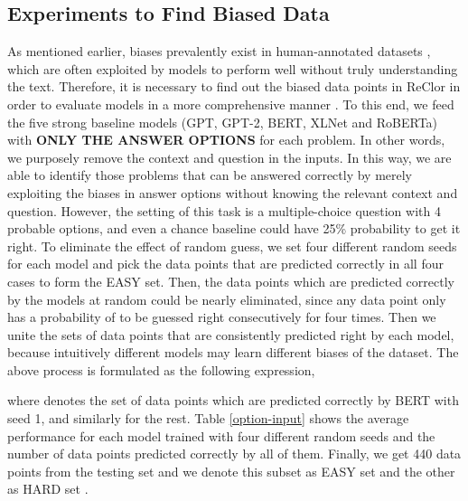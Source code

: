 \documentclass{article} \usepackage{iclr2020_conference,times}
\newcommand\bertbase{BERT\xspace}
\newcommand\xlnetbase{XLNet\xspace}
\newcommand\robertabase{RoBERTa\xspace}
\begin{document}
\subsection{Experiments to Find Biased Data}
As mentioned earlier, biases prevalently exist in human-annotated datasets \citep{poliak2018hypothesis, gururangan2018annotation, zellers2019hellaswag, niven2019probing}, which are often exploited by models to perform well without truly understanding the text. 
Therefore, it is necessary to find out the biased data points in ReClor in order to evaluate models in a more comprehensive manner \citep{sugawara2018makes}. To this end, we feed the five strong baseline models (GPT, GPT-2, \bertbase, \xlnetbase and \robertabase) with \textbf{ONLY THE ANSWER OPTIONS} for each problem. In other words, we purposely remove the context and question in the inputs. In this way, we are able to identify those problems that can be answered correctly by merely exploiting the biases in answer options without knowing the relevant context and question.  However, the setting of this task is a multiple-choice question with 4 probable options, and even a chance baseline could have 25\% probability to get it right. To eliminate the effect of random guess, we set four different random seeds for each model and pick the data points that are predicted correctly in all four cases to form the EASY set. Then, the data points which are predicted correctly by the models at random could be nearly eliminated, since any data point only has a probability of  to be guessed right consecutively for four times. Then we unite the sets of data points that are consistently predicted right by each model, because intuitively different models may learn different biases of the dataset. The above process is formulated as the following expression,


where  denotes the set of data points which are predicted correctly by \bertbase with seed 1, and similarly for the rest. Table \ref{option-input} shows the average performance for each model trained with four different random seeds and the number of data points predicted correctly by all of them. Finally, we get 440 data points from the testing set  and we denote this subset as EASY set  and the other as HARD set . 
\end{document}
